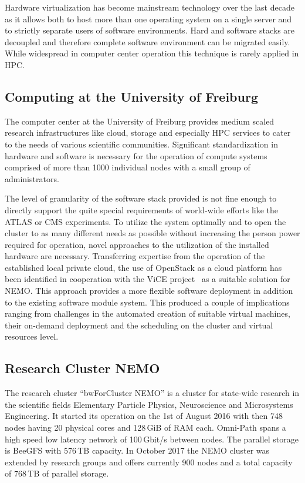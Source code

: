 Hardware virtualization has become mainstream technology over the last decade as it allows
both to host more than one operating system on a single server and to strictly
separate users of software environments.
Hard and software stacks are decoupled and therefore complete software
environment can be migrated easily.
While widespread in computer center
operation this technique is rarely applied in HPC.

\subsection{Computing at the University of Freiburg}

The computer center at the University of Freiburg provides
medium scaled research
infrastructures like cloud, storage and especially HPC services to cater to the
needs of various scientific communities. Significant standardization
in hardware and software is necessary for the operation of compute systems comprised of
more than 1000 individual nodes with a small group of administrators.

The level of granularity of the software stack provided is not fine enough to
directly support the quite special requirements of world-wide efforts like the
ATLAS or CMS experiments.
To utilize the system
optimally and to open the cluster to as many different needs as
possible without increasing the person power required for operation, novel approaches to the
utilization of the installed hardware are necessary.
Transferring expertise from the operation of the established local private cloud,
the use of OpenStack as a cloud platform has been identified
in cooperation with the ViCE project~\cite{vice}
as a
suitable solution for NEMO. This approach provides a more flexible software
deployment in addition to the existing software module system.
This produced a couple of
implications ranging from challenges in the automated creation of suitable
virtual machines, their on-demand deployment and the scheduling on the cluster
and virtual resources level.

\subsection{Research Cluster NEMO}

The research cluster ``bwForCluster NEMO'' is a cluster for state-wide
research in the scientific fields Elementary Particle Physics, Neuroscience and
Microsystems Engineering. It started its operation on the 1st of August 2016
with then 748 nodes having 20 physical cores and 128\,GiB of RAM each.
Omni-Path spans a high speed low latency network of 100\,Gbit/s between nodes.
The parallel storage is BeeGFS with
576\,TB capacity.
In October 2017 the NEMO cluster was extended by research groups and offers
currently 900 nodes and a total capacity of 768\,TB of parallel storage.

